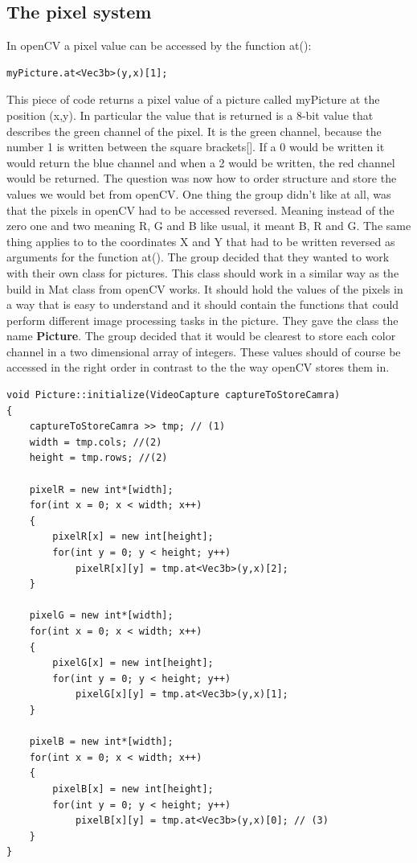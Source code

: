 \subsection{The pixel system}
In openCV a pixel value can be accessed by the function at():
\begin{lstlisting}
myPicture.at<Vec3b>(y,x)[1];
\end{lstlisting}
This piece of code returns a pixel value of a picture called myPicture at the position (x,y). In particular the value that is returned is a 8-bit value that describes the green channel of the pixel. It is the green channel, because the number 1 is written between the square brackets[]. If a 0 would be written it would return the blue channel and when a 2 would be written, the red channel would be returned.
The question was now how to order structure and store the values we would bet from openCV. One thing the group didn't like at all, was that the pixels in openCV had to be accessed reversed.  Meaning instead of the zero one and two meaning R, G and B like usual, it meant B, R and G. The same thing applies to to the coordinates X and Y that had to be written reversed as arguments for the function at().
The group decided that they wanted to work with their own class for pictures. This class should work in a similar way as the build in Mat class from openCV works. It should hold the values of the pixels in a way that is easy to understand and it should contain the functions that could perform different image processing tasks in the picture. They gave the class the name \textbf{Picture}.
The group decided that it would be clearest to store each color channel in a two dimensional array of integers. These values should of course be accessed in the right order in contrast to the the way openCV stores them in.
\begin{lstlisting}
void Picture::initialize(VideoCapture captureToStoreCamra)
{
	captureToStoreCamra >> tmp; // (1)
	width = tmp.cols; //(2)
	height = tmp.rows; //(2)

	pixelR = new int*[width];
	for(int x = 0; x < width; x++)
	{
		pixelR[x] = new int[height];
		for(int y = 0; y < height; y++)
			pixelR[x][y] = tmp.at<Vec3b>(y,x)[2];
	}

	pixelG = new int*[width];
	for(int x = 0; x < width; x++)
	{
		pixelG[x] = new int[height];
		for(int y = 0; y < height; y++)
			pixelG[x][y] = tmp.at<Vec3b>(y,x)[1];
	}

	pixelB = new int*[width];
	for(int x = 0; x < width; x++)
	{
		pixelB[x] = new int[height];
		for(int y = 0; y < height; y++)
			pixelB[x][y] = tmp.at<Vec3b>(y,x)[0]; // (3)
	}
}
\end{lstlisting}
